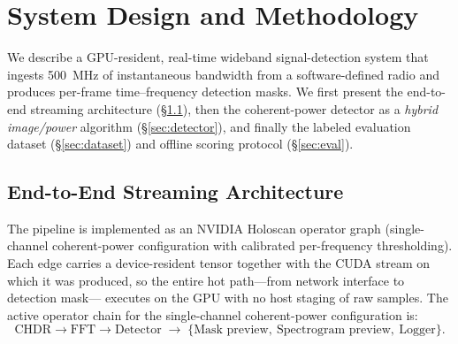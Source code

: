 
\section{System Design and Methodology}
\label{sec:methodology}

We describe a GPU-resident, real-time wideband signal-detection system that
ingests \SI{500}{\mega\hertz} of instantaneous bandwidth from a software-defined
radio and produces per-frame time--frequency detection masks. We first present
the end-to-end streaming architecture (\S\ref{sec:arch}), then the coherent-power
detector as a \emph{hybrid image/power} algorithm (\S\ref{sec:detector}), and
finally the labeled evaluation dataset (\S\ref{sec:dataset}) and offline scoring
protocol (\S\ref{sec:eval}).

\subsection{End-to-End Streaming Architecture}
\label{sec:arch}

The pipeline is implemented as an NVIDIA Holoscan operator graph (single-channel
coherent-power configuration with calibrated per-frequency thresholding). Each edge
carries a device-resident tensor together with the CUDA stream on which it was
produced, so the entire hot path---from network interface to detection mask---
executes on the GPU with no host staging of raw samples. The active operator
chain for the single-channel coherent-power configuration is:
%
\[
\text{CHDR}\!\rightarrow\!\text{FFT}\!\rightarrow\!\text{Detector}
\;\rightarrow\;\{\text{Mask preview},\ \text{Spectrogram preview},\ \text{Logger}\}.
\]

